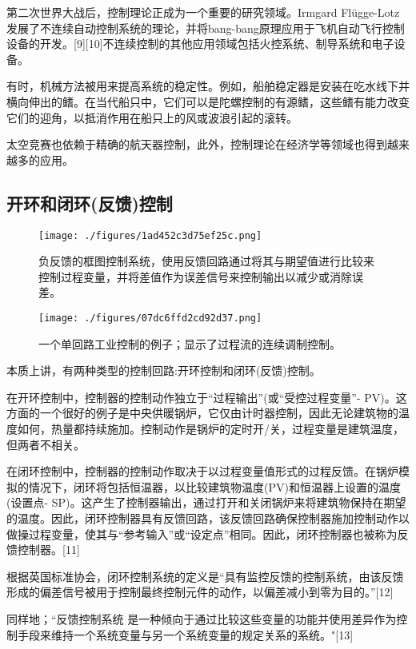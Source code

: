 第二次世界大战后，控制理论正成为一个重要的研究领域。Irmgard Flügge-Lotz发展了不连续自动控制系统的理论，并将bang-bang原理应用于飞机自动飞行控制设备的开发。[9][10]不连续控制的其他应用领域包括火控系统、制导系统和电子设备。

有时，机械方法被用来提高系统的稳定性。例如，船舶稳定器是安装在吃水线下并横向伸出的鳍。在当代船只中，它们可以是陀螺控制的有源鳍，这些鳍有能力改变它们的迎角，以抵消作用在船只上的风或波浪引起的滚转。

太空竞赛也依赖于精确的航天器控制，此外，控制理论在经济学等领域也得到越来越多的应用。

\subsection{开环和闭环(反馈)控制}

\begin{figure}[ht]
\centering
\texttt{[image: ./figures/1ad452c3d75ef25c.png]}
\caption{负反馈的框图控制系统，使用反馈回路通过将其与期望值进行比较来控制过程变量，并将差值作为误差信号来控制输出以减少或消除误差。} \label{fig_KZLL_3}
\end{figure}

\begin{figure}[ht]
\centering
\texttt{[image: ./figures/07dc6ffd2cd92d37.png]}
\caption{一个单回路工业控制的例子；显示了过程流的连续调制控制。} \label{fig_KZLL_4}
\end{figure}

本质上讲，有两种类型的控制回路:开环控制和闭环(反馈)控制。

在开环控制中，控制器的控制动作独立于“过程输出”(或“受控过程变量”- PV)。这方面的一个很好的例子是中央供暖锅炉，它仅由计时器控制，因此无论建筑物的温度如何，热量都持续施加。控制动作是锅炉的定时开/关，过程变量是建筑温度，但两者不相关。

在闭环控制中，控制器的控制动作取决于以过程变量值形式的过程反馈。在锅炉模拟的情况下，闭环将包括恒温器，以比较建筑物温度(PV)和恒温器上设置的温度(设置点- SP)。这产生了控制器输出，通过打开和关闭锅炉来将建筑物保持在期望的温度。因此，闭环控制器具有反馈回路，该反馈回路确保控制器施加控制动作以做操过程变量，使其与“参考输入”或“设定点”相同。因此，闭环控制器也被称为反馈控制器。[11]

根据英国标准协会，闭环控制系统的定义是“具有监控反馈的控制系统，由该反馈形成的偏差信号被用于控制最终控制元件的动作，以偏差减小到零为目的。”[12]

同样地；“反馈控制系统 是一种倾向于通过比较这些变量的功能并使用差异作为控制手段来维持一个系统变量与另一个系统变量的规定关系的系统。"[13]

